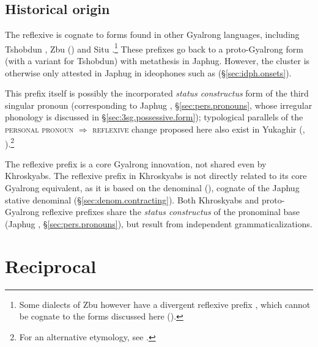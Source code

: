  
\subsection{Historical origin}  \label{sec:reflexive.origin}
The reflexive  is cognate to forms found in other Gyalrong languages, including Tshobdun  \citep{jackson14morpho}, Zbu  (\citealt[9]{gong18these}) and Situ .\footnote{Some dialects of Zbu however have a divergent reflexive prefix , which cannot be cognate to the forms discussed here (\citealt[9]{gong18these}). } These prefixes go back to a proto-Gyalrong form  (with a variant  for Tshobdun) with metathesis in Japhug. However, the cluster  is otherwise only attested in Japhug in ideophones such as  (§\ref{sec:idph.onsets}).

This prefix itself is possibly the incorporated \textit{status constructus} form of the third singular pronoun  (corresponding to Japhug , §\ref{sec:pers.pronouns}, whose irregular phonology is discussed in §\ref{sec:3sg.possessive.form}); typological parallels of the \textsc{personal pronoun} $\Rightarrow$ \textsc{reflexive} change proposed here also exist in Yukaghir (\citealt{jacques10refl}, \citealt[§5.2]{maslova07yukaghir}).\footnote{For an alternative etymology, see \citet{jackson14morpho}.}
 
The reflexive prefix is a core Gyalrong innovation, not shared even by Khroskyabs. The reflexive prefix  in Khroskyabs is not directly related to its core Gyalrong equivalent, as it is based on the denominal  (\citealt[300]{lai17khroskyabs}), cognate of the Japhug stative denominal  (§\ref{sec:denom.contracting}). Both Khroskyabs  and proto-Gyalrong  reflexive prefixes share the \textit{status constructus} of the pronominal base  (Japhug , §\ref{sec:pers.pronouns}), but result from independent grammaticalizations.

\section{Reciprocal} \label{sec:reciprocal}

